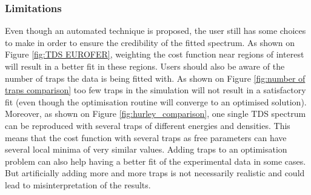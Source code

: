 

\subsubsection{Limitations}

Even though an automated technique is proposed, the user still has some choices to make in order to ensure the credibility of the fitted spectrum.
As shown on Figure \ref{fig:TDS EUROFER}, weighting the cost function near regions of interest will result in a better fit in these regions.
Users should also be aware of the number of traps the data is being fitted with.
As shown on Figure \ref{fig:number of traps comparison} too few traps in the simulation will not result in a satisfactory fit (even though the optimisation routine will converge to an optimised solution).
Moreover, as shown on Figure \ref{fig:hurley_comparison}, one single TDS spectrum can be reproduced with several traps of different energies and densities.
This means that the cost function with several traps as free parameters can have several local minima of very similar values.
Adding traps to an optimisation problem can also help having a better fit of the experimental data in some cases.
But artificially adding more and more traps is not necessarily realistic and could lead to misinterpretation of the results.

